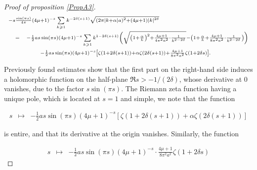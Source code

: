 \documentclass{jams-l}
\theoremstyle{definition}
\theoremstyle{remark}
\numberwithin{equation}{section}
\begin{document}
\begin{proof}[Proof of proposition \ref{PropA3}]
                \[ \begin{array}{lll}
                        \multicolumn{3}{l}{ \scriptstyle - s \frac{\sin \left(\pi s \right)}{4\pi} \left( 4 \mu + 1 \right)^{-s} \sum\limits_{k \geqslant 1} k^{-2 \delta \left( s+1 \right)} \sqrt{\left( 2 \pi \left \vert k + \alpha \right \vert a \right)^2 + \left( 4 \mu + 1 \right) \left \vert k \right \vert^{2 \delta}}} \\[1em]
                        
                        & \scriptstyle = & \scriptstyle - \frac{1}{2} a s \sin \left( \pi s \right) \left( 4 \mu + 1 \right)^{-s} \sum\limits_{k \geqslant 1} k^{1 - 2 \delta \left( s + 1 \right)} \left( \sqrt{ \left( 1 + \frac{\alpha}{k} \right)^2 + \frac{4 \mu + 1}{4 \pi^2 a^2} \cdot \frac{1}{k^{2-2\delta}}} - \left( 1 + \frac{\alpha}{k} + \frac{4 \mu + 1}{8 \pi^2 a^2} \cdot \frac{1}{k^{2-2\delta}} \right) \right) \\[1em]
                        
                        && \qquad \scriptstyle - \frac{1}{2} a s \sin \left( \pi s \right) \left( 4 \mu + 1 \right)^{-s} \left[ \zeta \left( 1 + 2 \delta \left( s+1 \right) \right) + \alpha \zeta \left( 2 \delta \left( s+1 \right) \right) + \frac{4\mu + 1}{8 \pi^2 a^2} \zeta \left( 1 + 2 \delta s \right) \right].
                    \end{array} \]
                
                \noindent Previously found estimates show that the first part on the right-hand side induces a holomorphic function on the half-plane $\Re s > - 1 / \left( 2 \delta \right)$, whose derivative at $0$ vanishes, due to the factor $s \sin \left( \pi s \right)$. The Riemann zeta function having a unique pole, which is located at $s=1$ and simple, we note that the function
                
                \[ \begin{array}{lll}
                        s & \longmapsto & - \frac{1}{2} a s \sin \left( \pi s \right) \left( 4 \mu + 1 \right)^{-s} \left[ \zeta \left( 1 + 2 \delta \left( s+1 \right) \right) + \alpha \zeta \left( 2 \delta \left( s+1 \right) \right) \right]
                    \end{array} \]
                
                \noindent is entire, and that its derivative at the origin vanishes. Similarly, the function
                
                \[ \begin{array}{lll}
                        s & \longmapsto & - \frac{1}{2} a s \sin \left( \pi s \right) \left( 4 \mu + 1 \right)^{-s} \cdot \frac{4 \mu + 1}{8 \pi^2 a ^2} \zeta \left( 1 + 2 \delta s \right)
                    \end{array} \]
                

\end{proof}
\end{document}
